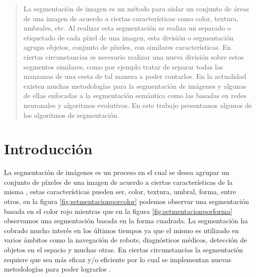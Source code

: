 \documentclass[conference,compsoc]{IEEEtran}
\begin{document}
\maketitle

\begin{abstract}
La segmentación de imagen es un método para aislar un conjunto de áreas de una imagen de acuerdo a ciertas características como color, textura, umbrales, etc. Al realizar esta segmentación se realiza un separado o etiquetado de cada píxel de una imagen, esta división o segmentación agrupa objetos, conjunto de píxeles, con similares características. En ciertas circunstancias es necesario realizar una nueva división sobre estos segmentos similares, como por ejemplo tratar de separar todas las manzanas de una cesta de tal manera a poder contarlos. En la actualidad existen muchas metodologías para la segmentación de imágenes y algunas de ellas enfocadas a la segmentación semántica como las basadas en redes neuronales y algoritmos evolutivos. En este trabajo presentamos algunos de los algoritmos de segmentación.
\end{abstract}

\providecommand{\keywords}[1]{\textbf{\textit{segmentación}}#1}


%
\IEEEpeerreviewmaketitle



\section{Introducción}
La segmentación de imágenes es un proceso en el cual se desea agrupar un conjunto de píxeles de una imagen de acuerdo a ciertas características de la misma \cite{tecsegm}, estas características pueden ser, color, textura, umbral, forma, entre otros, en la figura \ref{fig:setmentacionporcolor} podemos observar una segmentación basada en el color rojo mientras que en la figura \ref{fig:setmentacionporforma} observamos una segmentación basada en la forma cuadrada. La segmentación ha cobrado mucho interés en los últimos tiempos ya que el mismo es utilizado en varios ámbitos como la navegación de robots, diagnósticos médicos, detección de objetos en el espacio y muchas otras. En ciertas circunstancias la segmentación requiere que sea más eficaz y/o eficiente por lo cual se implementan nuevas metodologías para poder lograrlos \cite{segconv}\cite{algen}.
\end{document}

